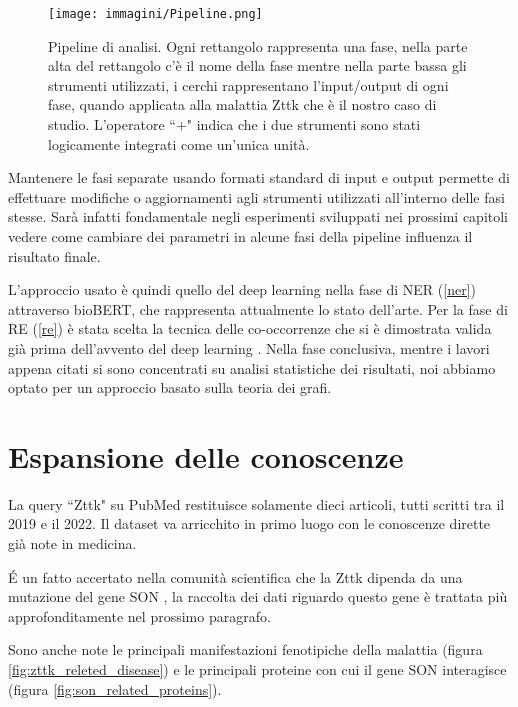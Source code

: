 \documentclass[12pt]{report}
\newcommand{\quotes}[1]{``#1"}
\begin{document}
\begin{figure}[!htb]
\centering
\texttt{[image: immagini/Pipeline.png]}
\caption{\footnotesize{Pipeline di analisi. Ogni rettangolo rappresenta una fase, nella parte alta del rettangolo c'è il nome della fase mentre nella parte bassa gli strumenti utilizzati, i cerchi rappresentano l'input/output di ogni fase, quando applicata alla malattia Zttk che è il nostro caso di studio. L'operatore \quotes{$+$} indica che i due strumenti sono stati logicamente integrati come un'unica unità.}}
\label{fig:pipeline}
\end{figure}

Mantenere le fasi separate usando formati standard di input e output permette di effettuare modifiche o aggiornamenti agli strumenti utilizzati all'interno delle fasi stesse. Sarà infatti fondamentale negli esperimenti sviluppati nei prossimi capitoli vedere come cambiare dei parametri in alcune fasi della pipeline influenza il risultato finale.

L'approccio usato è quindi quello del deep learning nella fase di NER (\ref{ner}) attraverso bioBERT, che rappresenta attualmente lo stato dell'arte. Per la fase di RE (\ref{re}) è stata scelta la tecnica delle co-occorrenze che si è dimostrata valida già prima dell'avvento del deep learning \cite{coocccao, cooccchen, cooccwang, cooccwang2}. Nella fase conclusiva, mentre i lavori appena citati si sono concentrati su analisi statistiche dei risultati, noi abbiamo optato per un approccio basato sulla teoria dei grafi.  


\section{Espansione delle conoscenze \label{conoscenze_partenza}}
La query \quotes{Zttk} su PubMed restituisce solamente dieci articoli, tutti scritti tra il 2019 e il 2022. Il dataset va arricchito in primo luogo con le conoscenze dirette già note in medicina.

\'E un fatto accertato nella comunità scientifica che la Zttk dipenda da una mutazione del gene SON \cite{zttkmala}, la raccolta dei dati riguardo questo gene è trattata più approfonditamente nel prossimo paragrafo.

Sono anche note le principali manifestazioni fenotipiche della malattia \cite{zttkmalasymtoms} (figura \ref{fig:zttk_releted_disease}) e le principali proteine con cui il gene SON interagisce \cite{soninteractingproteins} (figura \ref{fig:son_related_proteins}).
\end{document}
